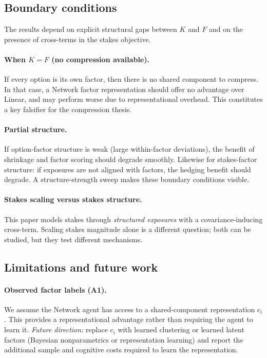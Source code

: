 \documentclass[11pt]{article}
\begin{document}
\subsection{Boundary conditions}

The results depend on explicit structural gaps between $K$ and $F$ and on the presence of cross-terms in the stakes objective.

\paragraph{When $K=F$ (no compression available).}
If every option is its own factor, then there is no shared component to compress. In that case, a Network factor representation should offer no advantage over Linear, and may perform worse due to representational overhead. This constitutes a key falsifier for the compression thesis.

\paragraph{Partial structure.}
If option-factor structure is weak (large within-factor deviations), the benefit of shrinkage and factor scoring should degrade smoothly. Likewise for stakes-factor structure: if exposures are not aligned with factors, the hedging benefit should degrade. A structure-strength sweep makes these boundary conditions visible.

\paragraph{Stakes scaling versus stakes structure.}
This paper models stakes through \emph{structured exposures} with a covariance-inducing cross-term. Scaling stakes magnitude alone is a different question; both can be studied, but they test different mechanisms.

\subsection{Limitations and future work}

\paragraph{Observed factor labels (A1).}
We assume the Network agent has access to a shared-component representation $c_i$. This provides a representational advantage rather than requiring the agent to learn it.
\emph{Future direction:} replace $c_i$ with learned clustering or learned latent factors (Bayesian nonparametrics or representation learning) and report the additional sample and cognitive costs required to learn the representation.
\end{document}
